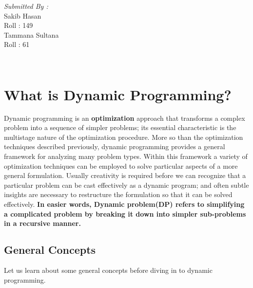 \documentclass[12pt]{article}
\begin{document}
\begin{titlepage}
\begin{minipage}{0.4\textwidth}
			\begin{flushright} \large
			\emph{Submitted By :} \\
			\vspace{6mm}
			Sakib Hasan\\
           		 Roll : 149\\
			\vspace{6mm}
            		Tammana Sultana\\
            		Roll : 61\\
		\end{flushright}
       
	\end{minipage}\\[10mm]
	
\end{titlepage}

  \newpage
  \section{What is Dynamic Programming?}
  Dynamic programming is an \textbf{optimization} approach that transforms a complex problem into a sequence of simpler problems; its essential characteristic is the multistage nature of the
  optimization procedure. More so than the optimization techniques described previously, dynamic programming provides a general framework for analyzing many problem types. Within this
  framework a variety of optimization techniques can be employed to solve particular aspects of a more general formulation. Usually creativity is required before we can recognize that a
  particular problem can be cast effectively as a dynamic program; and often subtle insights are necessary to restructure the formulation so that it can be solved effectively.\vspace{3mm} 
  \newline  \textbf{In easier words, Dynamic problem(DP) refers to simplifying a complicated problem by breaking it down into simpler sub-problems in a recursive manner.}

\subsection{General Concepts}
Let us learn about some general concepts before diving in to dynamic programming.
\end{document}
